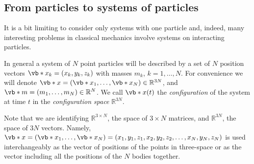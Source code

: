 \documentclass[english,fontsize=11pt,paper=b5]{scrbook}
\numberwithin{equation}{chapter}
\theoremstyle{definition}
\newcommand{\emphidx}[1]{\index{#1}\emph{#1}}
\begin{document}
  \subsection{From particles to systems of particles}

  It is a bit limiting to consider only systems with one particle and, indeed, many interesting problems in classical mechanics involve systems on interacting particles.

  In general a system of $N$ point particles  will be described by a set of $N$ position vectors $\vb*{x}_k = (x_k, y_k ,z_k)$ with masses $m_k$, $k = 1, \ldots, N$.
  For convenience we will denote $\vb*{x} = (\vb*{x}_1, \ldots, \vb*{x}_N)\in\mathbb{R}^{3N}$, and $\vb*{m} = (m_1, \ldots, m_N)\in\mathbb{R}^N$.
  We call $\vb*{x}(t)$ the \emphidx{configuration} of the system at time $t$ in the \emph{configuration space}  $\mathbb{R}^{3N}$.

  Note that we are identifying $\mathbb{R}^{3\times N}$, the space of $3\times N$ matrices, and $\mathbb{R}^{3N}$, the space of $3N$ vectors. Namely, $\vb*{x} = (\vb*{x}_1, \ldots, \vb*{x}_N) = (x_1, y_1, z_1, x_2, y_2, z_2, \ldots, x_N, y_N, z_N)$ is used interchangeably as the vector of positions of the points in three-space or as the vector including all the positions of the $N$ bodies together.
\end{document}
